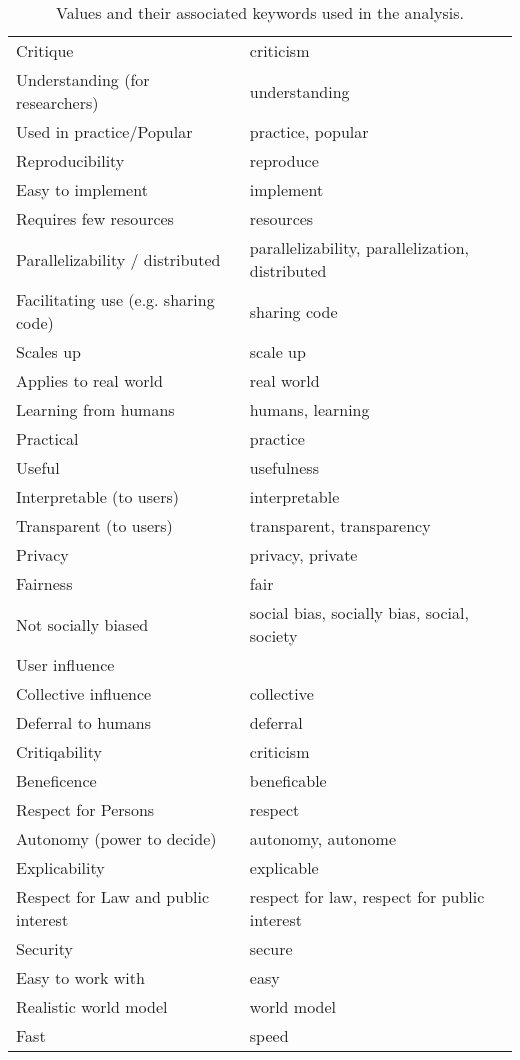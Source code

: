 \documentclass{article}
\begin{document}
\begin{table}[h]
\begin{tabular}{|l|l|}
        Critique & criticism \\
        Understanding (for researchers) & understanding \\
        Used in practice/Popular & practice, popular \\
        Reproducibility & reproduce \\
        Easy to implement & implement \\
        Requires few resources & resources \\
        Parallelizability / distributed & parallelizability, parallelization, distributed \\
        Facilitating use (e.g. sharing code) & sharing code \\
        Scales up & scale up \\
        Applies to real world & real world \\
        Learning from humans & humans, learning \\
        Practical & practice \\
        Useful & usefulness \\
        Interpretable (to users) & interpretable \\
        Transparent (to users) & transparent, transparency \\
        Privacy & privacy, private \\
        Fairness & fair \\
        Not socially biased & social bias, socially bias, social, society \\
        User influence \\
        Collective influence & collective \\
        Deferral to humans & deferral \\
        Critiqability & criticism \\
        Beneficence & beneficable \\
        Respect for Persons & respect \\
        Autonomy (power to decide) & autonomy, autonome \\
        Explicability & explicable \\
        Respect for Law and public interest & respect for law, respect for public interest \\
        Security & secure \\
        Easy to work with & easy \\
        Realistic world model & world model \\
        Fast & speed \\
        \hline
    \end{tabular}
    \caption{Values and their associated keywords used in the analysis.}
    \label{tab:keyword_table}
\end{table}
\end{document}
